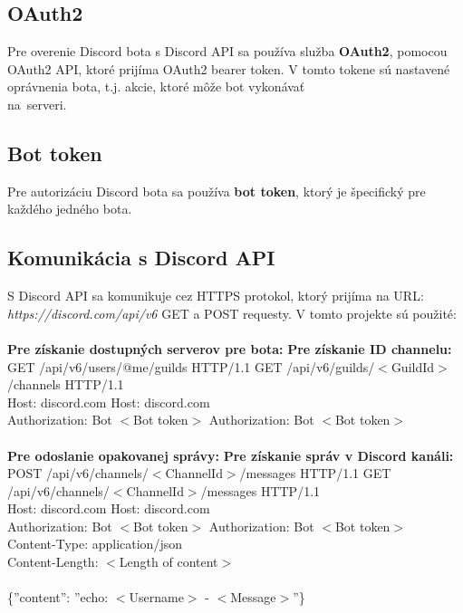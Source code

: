 \documentclass[11pt,a4paper]{article}
\begin{document}
	\subsection{OAuth2}
	Pre overenie Discord bota s Discord API sa používa služba \textbf{OAuth2}, pomocou OAuth2 API, ktoré prijíma OAuth2 bearer token. V tomto tokene sú nastavené oprávnenia bota, t.j. akcie, ktoré môže bot vykonávať\\na~serveri.
	\subsection{Bot token}
	Pre autorizáciu Discord bota sa používa \textbf{bot token}, ktorý je špecifický pre každého jedného bota.
	\subsection{Komunikácia s Discord API}
	S Discord API sa komunikuje cez HTTPS protokol, ktorý prijíma na URL: \emph{https://discord.com/api/v6} GET a POST requesty. V tomto projekte sú použité:\\
	\\\textbf{Pre získanie dostupných serverov pre bota:} \hspace{2.3cm} \textbf{Pre získanie ID channelu:}
	\\GET /api/v6/users/@me/guilds HTTP/1.1 \hspace{3 cm} GET /api/v6/guilds/$<$GuildId$>$/channels HTTP/1.1\\
	Host: discord.com \hspace{6.5cm} Host: discord.com\\
	Authorization: Bot $<$Bot token$>$ \hspace{4.2 cm} Authorization: Bot $<$Bot token$>$\\
	\\\textbf{Pre odoslanie opakovanej správy:} \hspace{3.6cm} \textbf{Pre získanie správ v Discord kanáli:}
	\\POST /api/v6/channels/$<$ChannelId$>$/messages HTTP/1.1  \hspace{0.13cm} GET /api/v6/channels/$<$ChannelId$>$/messages HTTP/1.1\\
	Host: discord.com \hspace{6.3cm} Host: discord.com\\
	Authorization: Bot $<$Bot token$>$ \hspace{4 cm} Authorization: Bot $<$Bot token$>$\\  \hspace{3.8 cm} Content-Type: application/json\\Content-Length: $<$Length of content$>$\\
	\\\{''content'': ''echo: $<$Username$>$ - $<$Message$>$''\}
	\newpage
\end{document}
